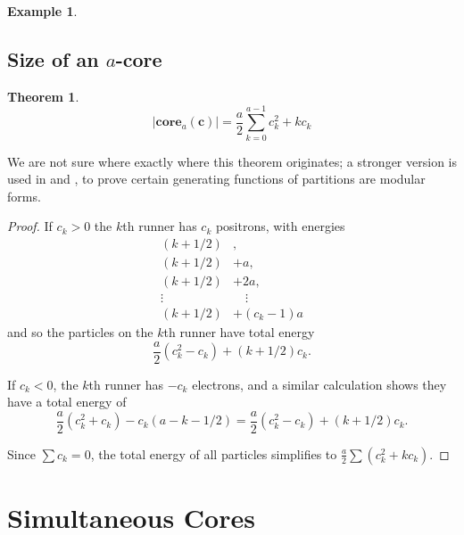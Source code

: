 \documentclass{amsart}[12pt]
\theoremstyle{definition}
\newtheorem{theorem}[dummy]{Theorem}
\newtheorem{example}[dummy]{Example}
\newcommand{\core}{\mathbf{core}}
\begin{document}
\begin{example}
\begin{center}
\end{center}
\end{example}




\subsection{Size of an \texorpdfstring{$a$}{a}-core}


\begin{theorem}
$$|\core_a(\mathbf{c})|=\frac{a}{2}\sum_{k=0}^{a-1} c_k^2+ kc_k$$
\end{theorem}

We are not sure where exactly where this theorem originates; a stronger version is used in \cite{GKS} and \cite{DS}, to prove certain generating
functions of partitions are modular forms.

\begin{proof}
 If  $c_k>0$ the $k$th runner has $c_k$ positrons, with
 energies 
\begin{align*}
(k+1/2)&,\\
(k+1/2)&+a, \\
(k+1/2)&+2a,\\
\vdots\quad &\quad \vdots \\
 (k+1/2)&+(c_k-1)a
\end{align*}
 and so the
 particles on the $k$th runner have total energy
 $$\frac{a}{2}(c_k^2-c_k)+(k+1/2)c_k.$$

 If $c_k<0$, the $k$th runner has $-c_k$ electrons, and a similar calculation shows they have a total energy of $$\frac{a}{2}(c_k^2+c_k)-c_k(a-k-1/2)=\frac{a}{2}(c_k^2-c_k)+(k+1/2)c_k.$$

Since $\sum c_k=0$, the total energy of all particles simplifies to $\frac{a}{2}\sum (c_k^2+kc_k)$.
\end{proof}


\section{Simultaneous Cores} \label{sec:AA}
\end{document}
